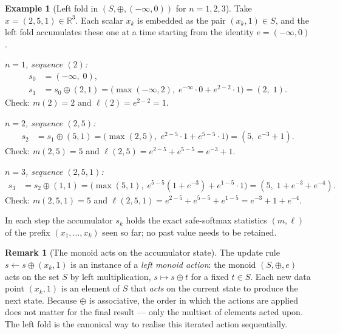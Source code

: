 \documentclass[11pt]{amsart}
\theoremstyle{plain}
\theoremstyle{definition}
\newtheorem{example}[theorem]{Example}
\newtheorem{remark}[theorem]{Remark}
\newcommand{\R}{\mathbb{R}}
\begin{document}
\begin{example}[Left fold in $(S,\oplus,(-\infty,0))$ for $n=1,2,3$]
\label{ex:foldl-small}
Take $x = (2, 5, 1) \in \R^3$.  Each scalar $x_k$ is embedded as the pair
$(x_k, 1) \in S$, and the left fold accumulates these one at a time
starting from the identity $e = (-\infty, 0)$.

\smallskip
\noindent\textit{$n=1$, sequence $(2)$:}
\begin{align*}
    s_0 &= (-\infty,\; 0), \\
    s_1 &= s_0 \oplus (2,1)
         = \bigl(\max(-\infty, 2),\;
                 e^{-\infty}\cdot 0 + e^{2-2}\cdot 1\bigr)
         = (2,\; 1).
\end{align*}
Check: $m(2) = 2$ and $\ell(2) = e^{2-2} = 1$.

\smallskip
\noindent\textit{$n=2$, sequence $(2,5)$:}
\begin{align*}
    s_2 &= s_1 \oplus (5,1)
         = \bigl(\max(2,5),\;
                 e^{2-5}\cdot 1 + e^{5-5}\cdot 1\bigr)
         = (5,\; e^{-3} + 1).
\end{align*}
Check: $m(2,5) = 5$ and $\ell(2,5) = e^{2-5} + e^{5-5} = e^{-3}+1$.

\smallskip
\noindent\textit{$n=3$, sequence $(2,5,1)$:}
\begin{align*}
    s_3 &= s_2 \oplus (1,1)
         = \bigl(\max(5,1),\;
                 e^{5-5}(1+e^{-3}) + e^{1-5}\cdot 1\bigr)
         = (5,\; 1 + e^{-3} + e^{-4}).
\end{align*}
Check: $m(2,5,1)=5$ and $\ell(2,5,1) = e^{2-5}+e^{5-5}+e^{1-5} = e^{-3}+1+e^{-4}$.

\smallskip
In each step the accumulator $s_k$ holds the exact safe-softmax statistics
$(m,\ell)$ of the prefix $(x_1,\ldots,x_k)$ seen so far; no past value
needs to be retained.
\end{example}

\begin{remark}[The monoid acts on the accumulator state]
\label{rem:monoid-action}
The update rule $s \leftarrow s \oplus (x_k, 1)$ is an instance of a
\emph{left monoid action}: the monoid $(S,\oplus,e)$ acts on the set $S$
by left multiplication, $s \mapsto s \oplus t$ for a fixed $t \in S$.
Each new data point $(x_k,1)$ is an element of $S$ that \emph{acts} on the
current state to produce the next state.  Because $\oplus$ is associative,
the order in which the actions are applied does not matter for the final
result — only the multiset of elements acted upon.  The left fold is the
canonical way to realise this iterated action sequentially.
\end{remark}
\end{document}
